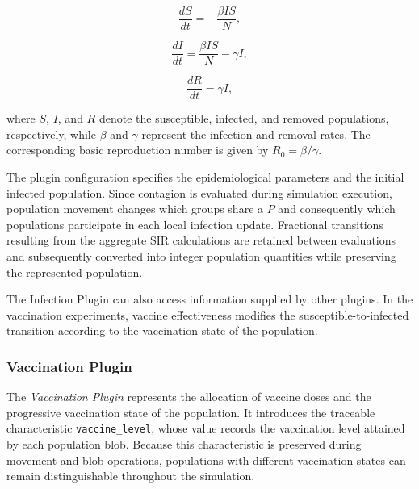 \begin{equation}
   \frac{dS}{dt}=-\frac{\beta I S}{N},
\end{equation}

\begin{equation}
   \frac{dI}{dt}=\frac{\beta I S}{N}-\gamma I,
\end{equation}

\begin{equation}
   \frac{dR}{dt}=\gamma I,
\end{equation}

where $S$, $I$, and $R$ denote the susceptible, infected, and removed populations, respectively, while $\beta$ and $\gamma$ represent the infection and removal rates. The corresponding basic reproduction number is given by $R_0=\beta/\gamma$.

The plugin configuration specifies the epidemiological parameters and the initial infected population. Since contagion is evaluated during simulation execution, population movement changes which groups share a $P$ and consequently which populations participate in each local infection update. Fractional transitions resulting from the aggregate SIR calculations are retained between evaluations and subsequently converted into integer population quantities while preserving the represented population.

The Infection Plugin can also access information supplied by other plugins. In the vaccination experiments, vaccine effectiveness modifies the susceptible-to-infected transition according to the vaccination state of the population. %

\subsubsection{Vaccination Plugin}
\label{sec:vaccination_plugin_inputs}

The \textit{Vaccination Plugin} represents the allocation of vaccine doses and the progressive vaccination state of the population. It introduces the traceable characteristic \texttt{vaccine\_level}, whose value records the vaccination level attained by each population blob. Because this characteristic is preserved during movement and blob operations, populations with different vaccination states can remain distinguishable throughout the simulation.

